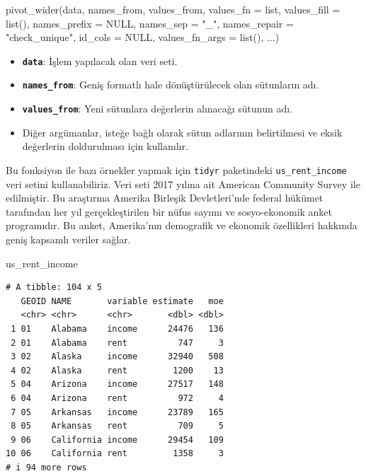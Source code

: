 \documentclass[
  letterpaper,
  DIV=11,
  numbers=noendperiod]{scrreprt}
\newenvironment{Shaded}{\begin{snugshade}}{\end{snugshade}}
\newcommand{\AttributeTok}[1]{\textcolor[rgb]{0.40,0.45,0.13}{#1}}
\newcommand{\ConstantTok}[1]{\textcolor[rgb]{0.56,0.35,0.01}{#1}}
\newcommand{\FunctionTok}[1]{\textcolor[rgb]{0.28,0.35,0.67}{#1}}
\newcommand{\NormalTok}[1]{\textcolor[rgb]{0.00,0.23,0.31}{#1}}
\newcommand{\StringTok}[1]{\textcolor[rgb]{0.13,0.47,0.30}{#1}}
\begin{document}
\begin{Shaded}
\begin{Highlighting}[]
\FunctionTok{pivot\_wider}\NormalTok{(data, names\_from, values\_from, }\AttributeTok{values\_fn =}\NormalTok{ list, }\AttributeTok{values\_fill =} \FunctionTok{list}\NormalTok{(), }\AttributeTok{names\_prefix =} \ConstantTok{NULL}\NormalTok{, }\AttributeTok{names\_sep =} \StringTok{"\_"}\NormalTok{, }\AttributeTok{names\_repair =} \StringTok{"check\_unique"}\NormalTok{, }\AttributeTok{id\_cols =} \ConstantTok{NULL}\NormalTok{, }\AttributeTok{values\_fn\_args =} \FunctionTok{list}\NormalTok{(), ...)}
\end{Highlighting}
\end{Shaded}

\begin{itemize}
\item
  \textbf{\texttt{data}}: İşlem yapılacak olan veri seti.
\item
  \textbf{\texttt{names\_from}}: Geniş formatlı hale dönüştürülecek olan
  sütunların adı.
\item
  \textbf{\texttt{values\_from}}: Yeni sütunlara değerlerin alınacağı
  sütunun adı.
\item
  Diğer argümanlar, isteğe bağlı olarak sütun adlarının belirtilmesi ve
  eksik değerlerin doldurulması için kullanılır.
\end{itemize}

Bu fonksiyon ile bazı örnekler yapmak için \texttt{tidyr} paketindeki
\texttt{us\_rent\_income} veri setini kullanabiliriz. Veri seti 2017
yılına ait American Community Survey ile edilmiştir. Bu araştırma
Amerika Birleşik Devletleri'nde federal hükümet tarafından her yıl
gerçekleştirilen bir nüfus sayımı ve sosyo-ekonomik anket programıdır.
Bu anket, Amerika'nın demografik ve ekonomik özellikleri hakkında geniş
kapsamlı veriler sağlar.

\begin{Shaded}
\begin{Highlighting}[]
\NormalTok{us\_rent\_income}
\end{Highlighting}
\end{Shaded}

\begin{verbatim}
# A tibble: 104 x 5
   GEOID NAME       variable estimate   moe
   <chr> <chr>      <chr>       <dbl> <dbl>
 1 01    Alabama    income      24476   136
 2 01    Alabama    rent          747     3
 3 02    Alaska     income      32940   508
 4 02    Alaska     rent         1200    13
 5 04    Arizona    income      27517   148
 6 04    Arizona    rent          972     4
 7 05    Arkansas   income      23789   165
 8 05    Arkansas   rent          709     5
 9 06    California income      29454   109
10 06    California rent         1358     3
# i 94 more rows
\end{verbatim}
\end{document}
